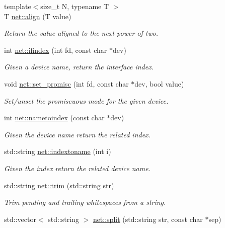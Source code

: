 \begin{DoxyCompactItemize}
\item 
{\footnotesize template$<$size\+\_\+t N, typename T $>$ }\\T \hyperlink{namespacenet_ac59f25900e63bf19f99bbcb44824b134}{net\+::align} (T value)
\begin{DoxyCompactList}\small\item\em Return the value aligned to the next power of two. \end{DoxyCompactList}\item 
int \hyperlink{namespacenet_a01d1d9ebab237e4740263e2deba1ab1d}{net\+::ifindex} (int fd, const char $\ast$dev)
\begin{DoxyCompactList}\small\item\em Given a device name, return the interface index. \end{DoxyCompactList}\item 
void \hyperlink{namespacenet_a69de0e47b041dff359c54fe92eb8830a}{net\+::set\+\_\+promisc} (int fd, const char $\ast$dev, bool value)
\begin{DoxyCompactList}\small\item\em Set/unset the promiscuous mode for the given device. \end{DoxyCompactList}\item 
int \hyperlink{namespacenet_aa90cbca6e910724bc46d5f4c2b12cddf}{net\+::nametoindex} (const char $\ast$dev)
\begin{DoxyCompactList}\small\item\em Given the device name return the related index. \end{DoxyCompactList}\item 
std\+::string \hyperlink{namespacenet_ac7628d7e4c8e89d8ada4d75c292f575f}{net\+::indextoname} (int i)
\begin{DoxyCompactList}\small\item\em Given the index return the related device name. \end{DoxyCompactList}\item 
std\+::string \hyperlink{namespacenet_a89ef9cb5b1526b5c5f613a837adc6392}{net\+::trim} (std\+::string str)
\begin{DoxyCompactList}\small\item\em Trim pending and trailing whitespaces from a string. \end{DoxyCompactList}\item 
std\+::vector$<$ std\+::string $>$ \hyperlink{namespacenet_af79f3419ccd7c7717d61ecb186f9faba}{net\+::split} (std\+::string str, const char $\ast$sep)

\end{DoxyCompactItemize}
